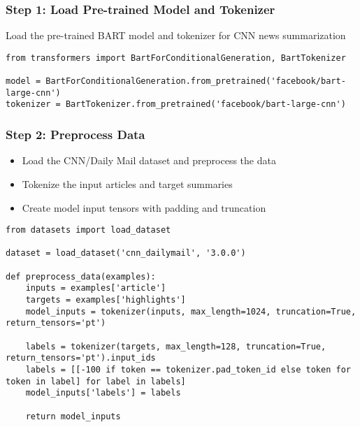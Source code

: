 \begin{frame}[fragile]\frametitle{Step 1: Load Pre-trained Model and Tokenizer}

Load the pre-trained BART model and tokenizer for CNN news summarization
  \begin{lstlisting}
from transformers import BartForConditionalGeneration, BartTokenizer

model = BartForConditionalGeneration.from_pretrained('facebook/bart-large-cnn')
tokenizer = BartTokenizer.from_pretrained('facebook/bart-large-cnn')
  \end{lstlisting}
\end{frame}

\begin{frame}[fragile]\frametitle{Step 2: Preprocess Data}

  \begin{itemize}
    \item Load the CNN/Daily Mail dataset and preprocess the data
    \item Tokenize the input articles and target summaries
    \item Create model input tensors with padding and truncation
  \end{itemize}
  
  \begin{lstlisting}
from datasets import load_dataset

dataset = load_dataset('cnn_dailymail', '3.0.0')

def preprocess_data(examples):
    inputs = examples['article']
    targets = examples['highlights']
    model_inputs = tokenizer(inputs, max_length=1024, truncation=True, return_tensors='pt')
    
    labels = tokenizer(targets, max_length=128, truncation=True, return_tensors='pt').input_ids
    labels = [[-100 if token == tokenizer.pad_token_id else token for token in label] for label in labels]
    model_inputs['labels'] = labels
    
    return model_inputs
  \end{lstlisting}

\end{frame}


